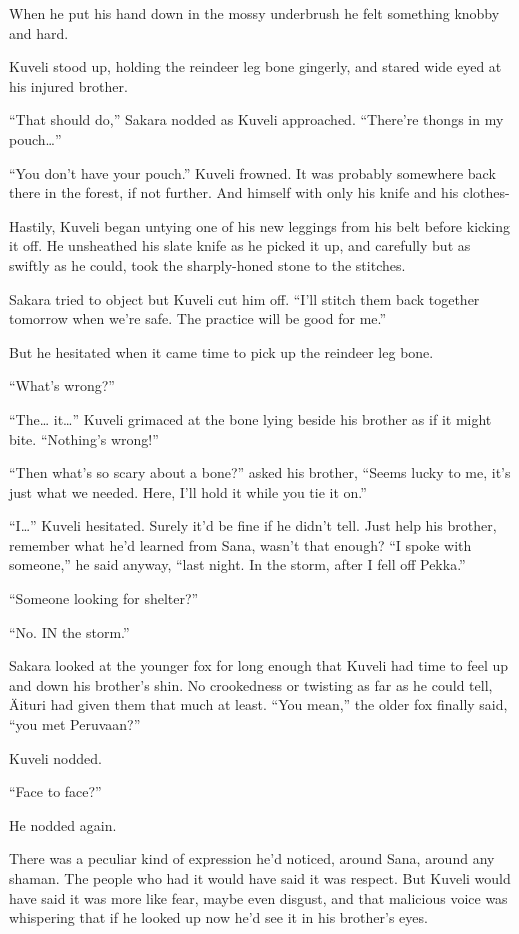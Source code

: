 When he put his hand down in the mossy underbrush he felt something knobby and hard.

Kuveli stood up, holding the reindeer leg bone gingerly, and stared wide eyed at his injured brother.

``That should do,'' Sakara nodded as Kuveli approached. ``There're thongs in my pouch\ldots''

``You don't have your pouch.'' Kuveli frowned. It was probably somewhere back there in the forest, if not further. And himself with only his knife and his clothes-

Hastily, Kuveli began untying one of his new leggings from his belt before kicking it off. He unsheathed his slate knife as he picked it up, and carefully but as swiftly as he could, took the sharply-honed stone to the stitches.

Sakara tried to object but Kuveli cut him off. ``I'll stitch them back together tomorrow when we're safe. The practice will be good for me.''

But he hesitated when it came time to pick up the reindeer leg bone.

``What's wrong?''

``The\ldots{} it\ldots'' Kuveli grimaced at the bone lying beside his brother as if it might bite. ``Nothing's wrong!''

``Then what's so scary about a bone?'' asked his brother, ``Seems lucky to me, it's just what we needed. Here, I'll hold it while you tie it on.''

``I\ldots'' Kuveli hesitated. Surely it'd be fine if he didn't tell. Just help his brother, remember what he'd learned from Sana, wasn't that enough? ``I spoke with someone,'' he said anyway, ``last night. In the storm, after I fell off Pekka.''

``Someone looking for shelter?''

``No. IN the storm.''

Sakara looked at the younger fox for long enough that Kuveli had time to feel up and down his brother's shin. No crookedness or twisting as far as he could tell, Äituri had given them that much at least. ``You mean,'' the older fox finally said, ``you met Peruvaan?''

Kuveli nodded.

``Face to face?''

He nodded again.

There was a peculiar kind of expression he'd noticed, around Sana, around any shaman. The people who had it would have said it was respect. But Kuveli would have said it was more like fear, maybe even disgust, and that malicious voice was whispering that if he looked up now he'd see it in his brother's eyes.


